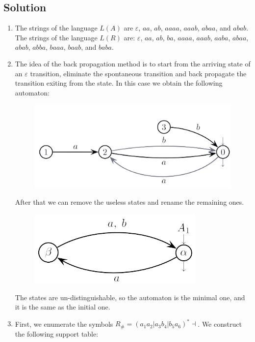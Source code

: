 \documentclass[12pt, a4paper]{report}
\begin{document}
    \subsection*{Solution}
        \begin{enumerate}
            \item The strings of the language $L(A)$ are $\varepsilon$, $aa$, $ab$, $aaaa$, $aaab$, $abaa$, and $abab$. 
                The strings of the language $L(R)$ are: $\varepsilon$, $aa$, $ab$, $ba$, $aaaa$, $aaab$, $aaba$, $abaa$, $abab$, $abba$, $baaa$, $baab$, and $baba$. 
            \item The idea of the back propagation method is to start from the arriving state of an $\varepsilon$ transition, eliminate the spontaneous transition and back propagate the transition exiting from the state.
                In this case we obtain the following automaton: 
                \begin{figure}[H]
                    \centering
                    \includegraphics[width=0.5\linewidth]{images/FSA2a.png}
                \end{figure}
                After that we can remove the useless states and rename the remaining ones. 
                \begin{figure}[H]
                    \centering
                    \includegraphics[width=0.5\linewidth]{images/FSA3a.png}
                \end{figure}
                The states are un-distinguishable, so the automaton is the minimal one, and it is the same as the initial one. 
            \item First, we enumerate the symbols $R_{\#}=\left( a_1a_2|a_3b_4|b_5a_6 \right)^{*}\dashv$. We construct the following support table: 
                \begin{table}[H]
                    \centering
                    \begin{tabular}{cc}

\end{tabular}
\end{table}
\end{enumerate}
\end{document}
